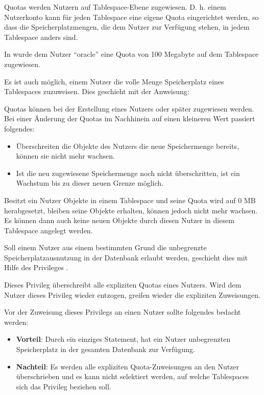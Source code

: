           Quotas werden Nutzern auf Tablespace-Ebene zugewiesen. D. h. einem Nutzerkonto kann f\"ur jeden Tablespace eine eigene Quota eingerichtet werden, so dass die Speicherplatzmengen, die dem Nutzer zur Verf\"ugung stehen, in jedem Tablespace anders sind.

          In  wurde dem Nutzer \enquote{oracle} eine Quota von 100 Megabyte auf dem Tablespace  zugewiesen.
          \begin{merke}
            Es ist auch m\"oglich, einem Nutzer die volle Menge Speicherplatz eines Tablespaces zuzuweisen. Dies geschieht mit der Anweisung: 
          \end{merke}

          Quotas k\"onnen bei der Erstellung eines Nutzers oder sp\"ater zugewiesen werden. Bei einer \"Anderung der Quotas im Nachhinein auf einen kleineren Wert passiert folgendes:
          \begin{itemize}
            \item \"Uberschreiten die Objekte des Nutzers die neue Speichermenge bereits, k\"onnen sie nicht mehr wachsen.
            \item Ist die neu zugewiesene Speichermenge noch nicht \"uberschritten, ist ein Wachstum bis zu dieser neuen Grenze m\"oglich.
          \end{itemize}
          Besitzt ein Nutzer Objekte in einem Tablespace und seine Quota wird auf 0 MB herabgesetzt, bleiben seine Objekte erhalten, k\"onnen jedoch nicht mehr wachsen. Es k\"onnen dann auch keine neuen Objekte durch diesen Nutzer in diesem Tablespace angelegt werden.

          Soll einem Nutzer aus einem bestimmten Grund die unbegrenzte Speicherplatzausnutzung in der Datenbank erlaubt werden, geschieht dies mit Hilfe des Privileges .
          \begin{merke}
            Dieses Privileg \"uberschreibt alle expliziten Quotas eines Nutzers. Wird dem Nutzer dieses Privileg wieder entzogen, greifen wieder die expliziten Zuweisungen.
          \end{merke}
          Vor der Zuweisung dieses Privilegs an einen Nutzer sollte folgendes bedacht werden:
          \begin{itemize}
            \item \textbf{Vorteil}: Durch ein einziges Statement, hat ein Nutzer unbegrenzten Speicherplatz in der gesamten Datenbank zur Verf\"ugung.
            \item \textbf{Nachteil}: Es werden alle expliziten  Quota-Zuweisungen an den Nutzer \"uberschrieben und es kann nicht selektiert werden, auf welche Tablespaces sich das Privileg  beziehen soll.
          \end{itemize}
